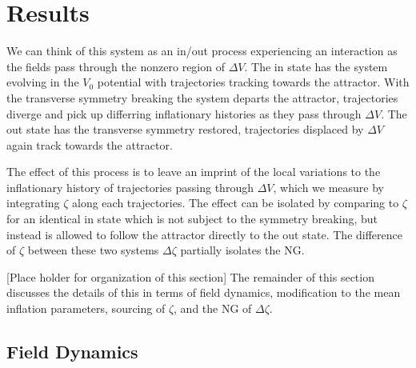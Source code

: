 
\section{Results} \label{sec:results}
We can think of this system as an in/out process experiencing an interaction as the fields pass through the nonzero region of $\Delta V$.
The in state has the system evolving in the $V_0$ potential with trajectories tracking towards the attractor.%
With the transverse symmetry breaking the system departs the attractor, trajectories diverge and pick up differring inflationary histories as they pass through $\Delta V$.
The out state has the transverse symmetry restored, trajectories displaced by $\Delta V$ again track towards the attractor.

The effect of this process is to leave an imprint of the local variations to the inflationary history of trajectories passing through $\Delta V$, which we measure by integrating $\zeta$ along each trajectories.
The effect can be isolated by comparing to $\zeta$ for an identical in state which is not subject to the symmetry breaking, but instead is allowed to follow the attractor directly to the out state.
The difference of $\zeta$ between these two systems $\Delta\zeta$ partially isolates the NG.

[Place holder for organization of this section] The remainder of this section discusses the details of this in terms of field dynamics, modification to the mean inflation parameters, sourcing of $\zeta$, and the NG of $\Delta\zeta$.

\subsection{Field Dynamics} \label{sec:field dynanics}

